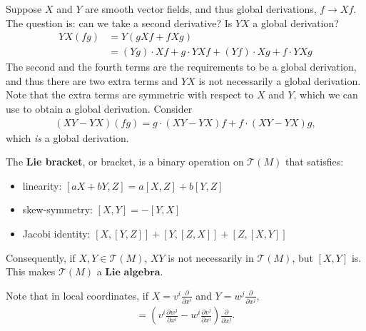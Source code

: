 \documentclass{../mathnotes}
\begin{document}
Suppose $X$ and $Y$ are smooth vector fields, and thus global derivations, $f\to Xf$. The question is: can we take a second derivative?
Is $YX$ a global derivation? 
\begin{align*}
    YX(fg)&=Y(gXf+fXg)\\
    &=(Yg)\cdot Xf+g\cdot YXf+(Yf)\cdot Xg+f\cdot YXg
\end{align*}
The second and the fourth terms are the requirements to be a global derivation, and thus there are two extra terms and $YX$ is not necessarily
a global derivation. Note that the extra terms are symmetric with respect to $X$ and $Y$, which we can use to obtain a global derivation. Consider
\begin{align*}
    (XY-YX)(fg)=g\cdot(XY-YX)f+f\cdot (XY-YX)g,
\end{align*}
which \textit{is} a global derivation.
\begin{defn}
    The \textbf{Lie bracket}, or bracket, is a binary operation on $\mathcal{T}(M)$ that satisfies:
    \begin{itemize}
        \item linearity: $[aX+bY,Z]=a[X,Z]+b[Y,Z]$
        \item skew-symmetry: $[X,Y]=-[Y,X]$
        \item Jacobi identity: $[X,[Y,Z]]+[Y,[Z,X]]+[Z,[X,Y]]$
    \end{itemize}
\end{defn}

Consequently, if $X,Y\in\mathcal{T}(M)$, $XY$ is not necessarily in $\mathcal{T}(M)$, but $[X,Y]$ is. This makes $\mathcal{T}(M)$ a $\textbf{Lie algebra}$.

Note that in local coordinates, if $X=v^i\frac{\partial}{\partial x^i}$ and $Y=w^j\frac{\partial}{\partial x^j}$,
\begin{align*}
    [X,Y]=\left( v^i\frac{\partial w^j}{\partial x^i}-w^i\frac{\partial v^j}{\partial x^i}\right)\frac{\partial}{\partial x^j}.
\end{align*}
\end{document}
